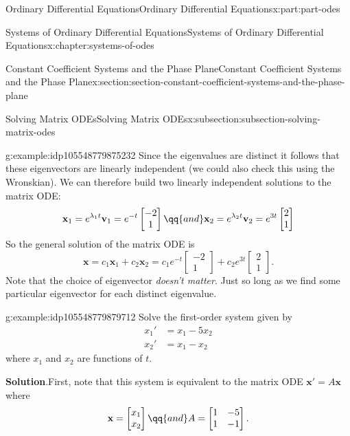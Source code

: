\documentclass[oneside,10pt,]{book}
\newcommand{\blocktitlefont}{\relax}
\numberwithin{equation}{part}
\renewcommand{\vec}[1]{\mathbf{#1}}
\newcommand{\amp}{&}
\begin{document}
\begin{partptx}{Ordinary Differential Equations}{}{Ordinary Differential Equations}{}{}{x:part:part-odes}
\begin{chapterptx}{Systems of Ordinary Differential Equations}{}{Systems of Ordinary Differential Equations}{}{}{x:chapter:systems-of-odes}
\begin{sectionptx}{Constant Coefficient Systems and the Phase Plane}{}{Constant Coefficient Systems and the Phase Plane}{}{}{x:section:section-constant-coefficient-systems-and-the-phase-plane}
\begin{subsectionptx}{Solving Matrix ODEs}{}{Solving Matrix ODEs}{}{}{x:subsection:subsection-solving-matrix-odes}
\begin{example}{}{g:example:idp105548779875232}
Since the eigenvalues are distinct it follows that these eigenvectors are linearly independent (we could also check this using the Wronskian). We can therefore build two linearly independent solutions to the matrix ODE:%
\begin{equation*}
\vec{x}_{1} = e^{\lambda_{1}t}\vec{v}_{1} = e^{-t}\begin{bmatrix}-2\\1\end{bmatrix}\qq{and} \vec{x}_{2} = e^{\lambda_{2}t}\vec{v}_{2} = e^{3t}\begin{bmatrix}2\\1\end{bmatrix}
\end{equation*}
So the general solution of the matrix ODE is%
\begin{equation*}
\vec{x} = c_{1}\vec{x}_{1} + c_{2}\vec{x}_{2} = c_{1}e^{-t}\begin{bmatrix}-2\\1\end{bmatrix} + c_{2}e^{3t}\begin{bmatrix}2\\1\end{bmatrix}.
\end{equation*}
Note that the choice of eigenvector \emph{doesn't matter}. Just so long as we find some particular eigenvector for each distinct eigenvalue.%
\end{example}
\begin{example}{}{g:example:idp105548779879712}%
Solve the first-order system given by%
\begin{align*}
x_{1}' \amp = x_{1} - 5x_{2}\\
x_{2}' \amp = x_{1} - x_{2}
\end{align*}
where \(x_{1}\) and \(x_{2}\) are functions of \(t\).%
\par\smallskip%
\noindent\textbf{\blocktitlefont Solution}.\hypertarget{g:solution:idp105548779882144}{}\quad{}First, note that this system is equivalent to the matrix ODE \(\vec{x}' = A\vec{x}\) where%
\begin{equation*}
\vec{x} = \begin{bmatrix}x_{1} \\ x_{2}\end{bmatrix}\qq{and} A = \begin{bmatrix}1 \amp  -5 \\ 1 \amp  -1\end{bmatrix}.
\end{equation*}

\end{example}
\end{subsectionptx}
\end{sectionptx}
\end{chapterptx}
\end{partptx}
\end{document}
